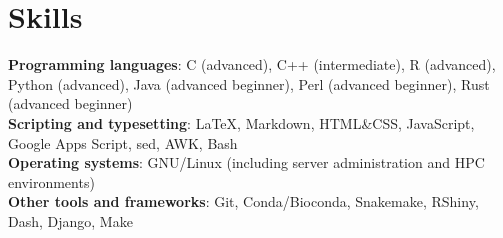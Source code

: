 \documentclass[letterpaper,10.5pt]{article}
\begin{document}
\section{Skills}
\textbf{Programming languages}: C (advanced), C++ (intermediate), R (advanced), Python (advanced), Java (advanced beginner), Perl (advanced beginner), Rust (advanced beginner) \\
\textbf{Scripting and typesetting}: \LaTeX, Markdown, HTML\&CSS, JavaScript, Google Apps Script, sed, AWK, Bash \\
\textbf{Operating systems}: GNU/Linux (including server administration and HPC environments) \\
\textbf{Other tools and frameworks}: Git,  Conda/Bioconda, Snakemake, RShiny, Dash, Django, Make \\





\end{document}
